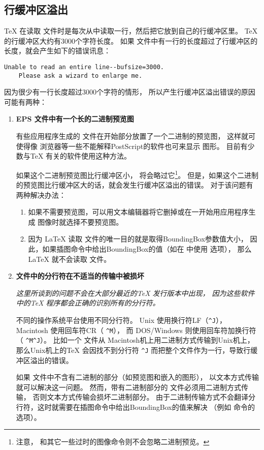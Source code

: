 \subsection{行缓冲区溢出}\label{ssec:linebuffer}

\TeX{} 在读取 \ascii 文件时是每次从中读取一行，然后把它放到自己的行缓冲区里。
\TeX{} 的行缓冲区大约有3000个字符长度。
如果  文件中有一行的长度超过了行缓冲区的长度，就会产生如下的错误讯息：

\begin{Verbatim}[xleftmargin=22pt]
	Unable to read an entire line--bufsize=3000.
	Please ask a wizard to enlarge me.
\end{Verbatim}

因为很少有一行长度超过3000个字符的情形，
所以产生行缓冲区溢出错误的原因可能有两种：

\begin{enumerate}
	\item \textbf{ EPS 文件中有一个长的二进制预览图}

	有些应用程序生成的 文件在开始部分放置了一个二进制的预览图，
	这样就可使得像 浏览器等一些不能解释PostScript的软件也可来显示  图形。
	目前有少数与\TeX{} 有关的软件使用这种方法。
	
	如果这个二进制预览图比行缓冲区小， 将会略过它\footnote{
        注意， 和其它一些过时的图像命令则不会忽略二进制预览。}。
	但是，如果这个二进制的预览图比行缓冲区大的话，就会发生行缓冲区溢出的错误。
	对于该问题有两种解决办法：
	
	\begin{enumerate}
		\item 如果不需要预览图，可以用文本编辑器将它删掉或在一开始用应用程序生成 图像时就选择不要预览图。
		\item 因为 \LaTeX{} 读取  文件的唯一目的就是取得BoundingBox参数值大小，
		因此，如果插图命令中给出BoundingBox的值（如在  中使用  选项），
		那么\LaTeX{} 就不会读取  文件。
	\end{enumerate}
	
	\item \textbf{ 文件中的分行符在不适当的传输中被损坏}
	
	\emph{这里所谈到的问题不会在大部分最近的\TeX{} 发行版本中出现，
		因为这些软件中的\TeX{} 程序都会正确的识别所有的分行符。}
	
	不同的操作系统平台使用不同分行符。
	Unix 使用换行符LF（\verb+^J+），
	Macintosh 使用回车符CR（ \verb+^M+），
	而 DOS/Windows 则使用回车符加换行符（ \verb+^M^J+）。
	比如一个 文件从 Macintosh机上用二进制方式传输到Unix机上，
	那么Unix机上的\TeX{} 会因找不到分行符 \verb+^J+ 而把整个文件作为一行，导致行缓冲区溢出的错误。
	
	如果 文件中不含有二进制的部分（如预览图和嵌入的图形），
	以文本方式传输就可以解决这一问题。
	然而，带有二进制部分的  文件必须用二进制方式传输，
	否则文本方式传输会损坏二进制部分。
	由于二进制传输方式不会翻译分行符，这时就需要在插图命令中给出BoundingBox的值来解决
	（例如  命令的  选项）。
\end{enumerate}

